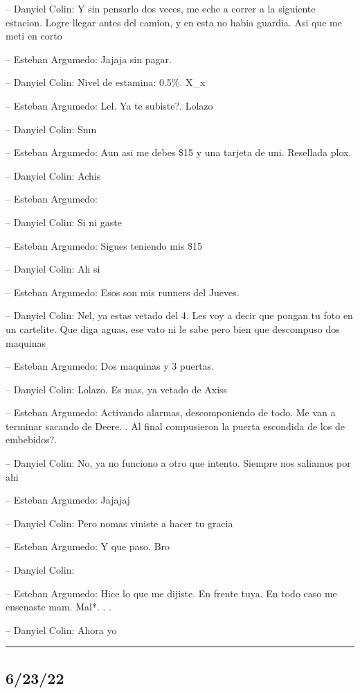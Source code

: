 -- Danyiel Colin: Y sin pensarlo dos veces, me eche a correr a la
siguiente estacion. Logre llegar antes del camion, y en esta no habia
guardia. Asi que me meti en corto

-- Esteban Argumedo: Jajaja sin pagar.

-- Danyiel Colin: Nivel de estamina: 0.5\%. X\_x

-- Esteban Argumedo: Lel. Ya te subiste?. Lolazo

-- Danyiel Colin: Smn

-- Esteban Argumedo: Aun asi me debes \$15 y una tarjeta de uni.
Resellada plox.

-- Danyiel Colin: Achis

-- Esteban Argumedo:

-- Danyiel Colin: Si ni gaste

-- Esteban Argumedo: Sigues teniendo mis \$15

-- Danyiel Colin: Ah si

-- Esteban Argumedo: Esos son mis runners del Jueves.

-- Danyiel Colin: Nel, ya estas vetado del 4. Les voy a decir que pongan
tu foto en un cartelite. Que diga aguas, ese vato ni le sabe pero bien
que descompuso dos maquinas

-- Esteban Argumedo: Dos maquinas y 3 puertas.

-- Danyiel Colin: Lolazo. Es mas, ya vetado de Axiss

-- Esteban Argumedo: Activando alarmas, descomponiendo de todo. Me van a
terminar sacando de Deere. . Al final compusieron la puerta escondida de
los de embebidos?.

-- Danyiel Colin: No, ya no funciono a otro que intento. Siempre nos
saliamos por ahi

-- Esteban Argumedo: Jajajaj

-- Danyiel Colin: Pero nomas viniste a hacer tu gracia

-- Esteban Argumedo: Y que paso. Bro

-- Danyiel Colin:

-- Esteban Argumedo: Hice lo que me dijiste. En frente tuya. En todo
caso me ensenaste mam. Mal*. . .

-- Danyiel Colin: Ahora yo

\begin{center}\rule{0.5\linewidth}{0.5pt}\end{center}

\hypertarget{section-109}{%
\subsection{6/23/22}\label{section-109}}

